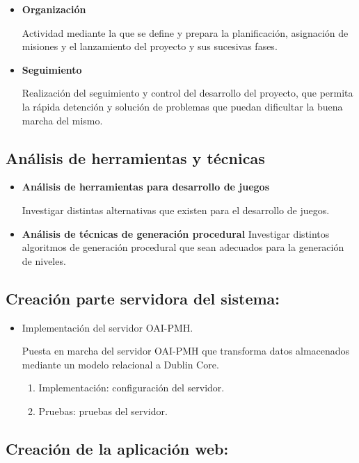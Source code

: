 \begin{itemize}
	\item \textbf{Organización}

	Actividad mediante la que se define y prepara la planificación, asignación de misiones y el lanzamiento del proyecto y sus sucesivas fases.
	\item \textbf{Seguimiento}

	Realización del seguimiento y control del desarrollo del proyecto, que permita la rápida detención y solución de problemas que puedan dificultar la buena marcha del mismo.
\end{itemize}

\subsection{Análisis de herramientas y técnicas}

\begin{itemize}
	\item \textbf{Análisis de herramientas para desarrollo de juegos}
	
	Investigar distintas alternativas que existen para el desarrollo de juegos.

	\item \textbf{Análisis de técnicas de generación procedural}
	Investigar distintos algoritmos de generación procedural que sean adecuados para la generación de niveles.
\end{itemize}

\subsection{Creación parte servidora del sistema:}

\begin{itemize}
	\item Implementación del servidor OAI-PMH.

	Puesta en marcha del servidor OAI-PMH que transforma datos almacenados mediante un modelo relacional a Dublin Core.

	\begin{enumerate}
		\item Implementación: configuración del servidor.
		\item Pruebas: pruebas del servidor.
	\end{enumerate}
\end{itemize}

\subsection{Creación de la aplicación web:}

